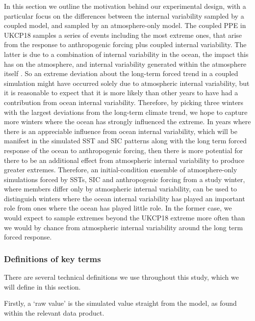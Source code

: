       In this section we outline the motivation behind our experimental design, with a particular focus on the differences between the internal variability sampled by a coupled model, and sampled by an atmosphere-only model. The coupled PPE in UKCP18 samples a series of events including the most extreme ones, that arise from the response to anthropogenic forcing plus coupled internal variability. The latter is due to a combination of internal variability in the ocean, the impact this has on the atmosphere, and internal variability generated within the atmosphere itself \citep{sexton_detection_2001}. So an extreme deviation about the long-term forced trend in a coupled simulation might have occurred solely due to atmospheric internal variability, but it is reasonable to expect that it is more likely than other years to have had a contribution from ocean internal variability. Therefore, by picking three winters with the largest deviations from the long-term climate trend, we hope to capture more winters where the ocean has strongly influenced the extreme. In years where there is an appreciable influence from ocean internal variability, which will be manifest in the simulated SST and SIC patterns along with the long term forced response of the ocean to anthropogenic forcing, then there is more potential for there to be an additional effect from atmospheric internal variability to produce greater extremes. Therefore, an initial-condition ensemble of atmosphere-only simulations forced by SSTs, SIC and anthropogenic forcing from a study winter, where members differ only by atmospheric internal variability, can be used to distinguish winters where the ocean internal variability has played an important role from ones where the ocean has played little role. In the former case, we would expect to sample extremes beyond the UKCP18 extreme more often than we would by chance from atmospheric internal variability around the long term forced response.
  
    \subsubsection{Definitions of key terms}

      There are several technical definitions we use throughout this study, which we will define in this section.

      Firstly, a `raw value' is the simulated value straight from the model, as found within the relevant data product.

